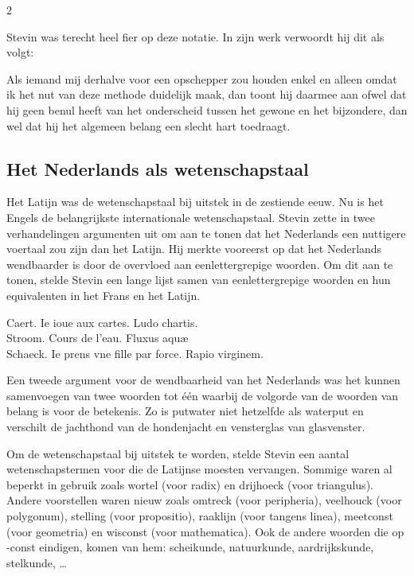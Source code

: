     \begin{multicols}{2}

    Stevin was terecht heel fier op deze notatie. In zijn werk verwoordt hij dit als volgt:
    
    \begin{citaat}
    Als iemand mij derhalve voor een opschepper zou houden enkel en alleen omdat ik het nut van deze methode duidelijk maak, dan toont hij daarmee aan ofwel dat hij geen benul heeft van het onderscheid tussen het gewone en het bijzondere, dan wel dat hij het algemeen belang een slecht hart toedraagt.
    \end{citaat}

 
    
    
    \subsection*{Het Nederlands als wetenschapstaal}

    Het Latijn was de wetenschapstaal bij uitstek in de zestiende eeuw. Nu is het Engels de belangrijkste internationale wetenschapstaal. Stevin zette in twee verhandelingen argumenten uit om aan te tonen dat het Nederlands een nuttigere voertaal zou zijn dan het Latijn. Hij merkte vooreerst op dat het Nederlands wendbaarder is door de overvloed aan eenlettergrepige woorden. Om dit aan te tonen, stelde Stevin een lange lijst samen van eenlettergrepige woorden en hun equivalenten in het Frans en het Latijn.
    \begin{citaat}
        Caert. Ie ioue aux cartes. Ludo chartis.\\
        Stroom. Cours de l'eau. Fluxus aquæ \\
        Schaeck. Ie prens vne fille par force. Rapio virginem.
    \end{citaat}

    Een tweede argument voor de wendbaarheid van het Nederlands was het kunnen samenvoegen van twee woorden tot één waarbij de volgorde van de woorden van belang is voor de betekenis. Zo is putwater niet hetzelfde als waterput en verschilt de jachthond van de hondenjacht en vensterglas van glasvenster.

    Om de wetenschapstaal bij uitstek te worden, stelde Stevin een aantal wetenschapstermen voor die de Latijnse moesten vervangen. Sommige waren al beperkt in gebruik zoals wortel (voor radix) en drijhoeck (voor triangulus). Andere voorstellen waren nieuw zoals omtreck (voor peripheria), veelhouck (voor polygonum), stelling (voor propositio), raaklijn (voor tangens linea), meetconst (voor geometria) en wisconst (voor mathematica). Ook de andere woorden die op -const eindigen, komen van hem: scheikunde, natuurkunde, aardrijkskunde, stelkunde, \ldots


\end{multicols}
